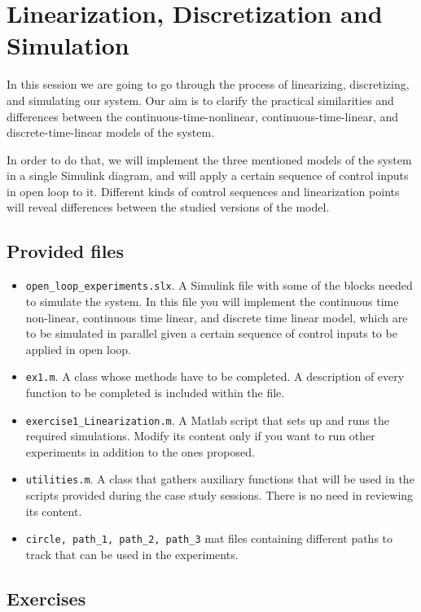 \setcounter{chapter}{0}
\chapter{Linearization, Discretization and Simulation}
In this session we are going to go through the process of linearizing, discretizing, and simulating our system.
Our aim is to clarify the practical similarities and differences between the continuous-time-nonlinear, continuous-time-linear, and discrete-time-linear models of the system.\par
%
In order to do that, we will implement the three mentioned models of the system in a single Simulink diagram, and will apply a certain sequence of control inputs in open loop to it. 
Different kinds of control sequences and linearization points will reveal differences between the studied versions of the model. 
%
\section{Provided files}
\begin{itemize}
	\setlength\itemsep{0em}
	\item \texttt{open\_loop\_experiments.slx}.
		A Simulink file with some of the blocks needed to simulate the system. 
		In this file you will implement the continuous time non-linear, continuous time linear, and discrete time linear model, which are to be simulated in parallel given a certain sequence of control inputs to be applied in open loop. 
	\item \texttt{ex1.m}.
		A class whose methods have to be completed.
		A description of every function to be completed is included within the file.
	\item \texttt{exercise1\_Linearization.m}.
		A Matlab script that sets up and runs the required simulations.
		Modify its content only if you want to run other experiments in addition to the ones proposed.
	\item \texttt{utilities.m}.
		A class that gathers auxiliary functions that will be used in the scripts provided during the case study sessions.
		There is no need in reviewing its content.
	\item \texttt{circle, path\_1, path\_2, path\_3}  mat files containing different paths to track that can be used in the experiments.
\end{itemize}		
%
\section{Exercises}
